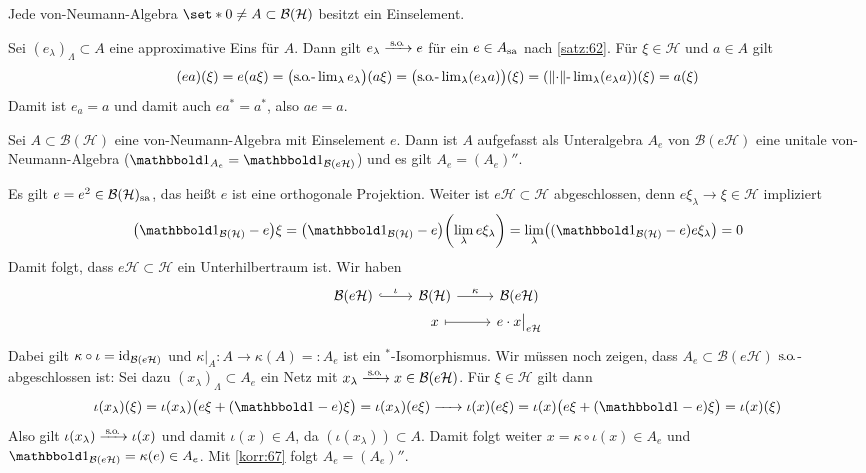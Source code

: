 \begin{proposition}[{name=[von-Neumann-Algebren haben Einselemente]},label=prop:68]
	Jede von-Neumann-Algebra $\set*{0}\neq A \subset \mathcal{B}(\mathcal{H})$ besitzt ein Einselement.
\end{proposition}
\begin{beweis}
	Sei $(e_\lambda)_\Lambda \subset A$ eine approximative Eins für $A$.
	Dann gilt $e_\lambda \grenzw{\raisemath{-3pt}{\so}}e$ für ein $e \in A_{\mathrm{sa}}$ nach \autoref{satz:62}.
	Für $\xi \in \mathcal{H}$ und $a \in A$ gilt
	\[
		(ea)(\xi) = e \enbrace*{a \xi} = \enbrace[\big]{\so\text{-}\lim\nolimits_\lambda e_\lambda} (a \xi) = \enbrace[\big]{\so\text{-}\lim\nolimits_\lambda (e_\lambda a)}(\xi) = \enbrace*{\norm{\cdot}\text{-}\lim\nolimits_\lambda (e_\lambda a)}(\xi) = a(\xi)
	\]
	Damit ist $e_a =a$ und damit auch $e a^*= a^*$, also $a e =a$.
\end{beweis}

\begin{proposition}
	Sei $A \subset \mathcal{B}(\mathcal{H})$ eine von-Neumann-Algebra mit Einselement $e$.
	Dann ist $A$ aufgefasst als Unteralgebra $A_e$ von $\mathcal{B}(e \mathcal{H})$ eine unitale von-Neumann-Algebra ($\ind_{A_e}= \ind_{\mathcal{B}(e \mathcal{H})}$) und es gilt $A_e = (A_e)''$.
\end{proposition}
\begin{beweis}
	Es gilt $e=e^2 \in \mathcal{B}(\mathcal{H})_{\mathrm{sa}}$, das heißt $e$ ist eine orthogonale Projektion.
	Weiter ist $e \mathcal{H} \subset \mathcal{H}$ abgeschlossen, denn $e \xi_\lambda \to \xi \in \mathcal{H}$ impliziert
	\[
		\enbrace*{\ind_{\mathcal{B}(\mathcal{H})} - e} \xi = \enbrace*{\ind_{\mathcal{B}(\mathcal{H})}- e} \enbrace*{\lim_\lambda e \xi_\lambda} = \lim_\lambda \enbrace*{(\ind_{\mathcal{B}(\mathcal{H})}-e) e \xi_\lambda} = 0
	\]
	Damit folgt, dass $e \mathcal{H} \subset \mathcal{H}$ ein Unterhilbertraum ist. Wir haben
	\[
		\begin{tikzcd}[row sep=0pt]
			\mathcal{B}(e \mathcal{H}) \rar[hook,"\iota"] & \mathcal{B}(\mathcal{H}) \rar["\kappa"] & \mathcal{B}(e \mathcal{H}) \\
			& x \rar[mapsto] & e \cdot x\big|_{e \mathcal{H}}
		\end{tikzcd}
	\]
	Dabei gilt $\kappa \circ \iota = \operatorname{id}_{\mathcal{B}(e\mathcal{H})}$ und $\kappa|_A \colon A \to \kappa(A) =: A_e$ ist ein $^*$-Isomorphismus.
	Wir müssen noch zeigen, dass $A_e \subset \mathcal{B}(e\mathcal{H})$ $\mathrm{s\mkern-1.4mu.\mkern-.6mu o\mkern-1.7mu.}$-abgeschlossen ist:
	Sei dazu $(x_\lambda)_\Lambda \subset A_e$ ein Netz mit $x_\lambda \grenzw{\raisemath{-3pt}{\so}} x \in \mathcal{B}(e \mathcal{H})$.
	Für $\xi \in \mathcal{H}$ gilt dann
	\[
		\iota(x_\lambda) (\xi) = \iota(x_\lambda) \enbrace[\big]{e \xi + (\ind -e) \xi} = \iota(x_\lambda)(e \xi) \grenzw{} \iota(x)(e \xi) = \iota(x) \enbrace[\big]{e \xi + (\ind -e) \xi} = \iota(x) (\xi)
	\]
	Also gilt $\iota(x_\lambda) \grenzw{\raisemath{-3pt}{\so}} \iota(x)$ und damit $\iota(x) \in A$, da $(\iota(x_\lambda)) \subset A$.
	Damit folgt weiter $x = \kappa \circ \iota(x) \in  A_e$ und $\ind_{\mathcal{B}(e \mathcal{H})} = \kappa(e) \in A_e$. Mit \autoref{korr:67} folgt $A_e= (A_e)''$.
\end{beweis}

